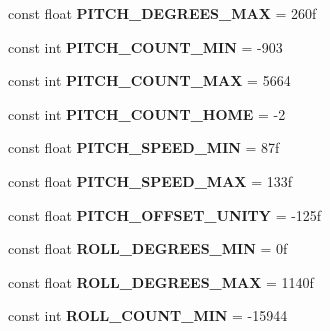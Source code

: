 \begin{DoxyCompactItemize}
const float {\bfseries P\+I\+T\+C\+H\+\_\+\+D\+E\+G\+R\+E\+E\+S\+\_\+\+M\+AX} = 260f
\item 
\mbox{\label{class_scorbot_e_r_v_plus_a415a048b02269851a05f53c812ef5598}} 
const int {\bfseries P\+I\+T\+C\+H\+\_\+\+C\+O\+U\+N\+T\+\_\+\+M\+IN} = -\/903
\item 
\mbox{\label{class_scorbot_e_r_v_plus_a9f7d1ace1dc05a380a038dcac8e66d97}} 
const int {\bfseries P\+I\+T\+C\+H\+\_\+\+C\+O\+U\+N\+T\+\_\+\+M\+AX} = 5664
\item 
\mbox{\label{class_scorbot_e_r_v_plus_ae92515118ebb9a15ed56075a6cf410c4}} 
const int {\bfseries P\+I\+T\+C\+H\+\_\+\+C\+O\+U\+N\+T\+\_\+\+H\+O\+ME} = -\/2
\item 
\mbox{\label{class_scorbot_e_r_v_plus_aa6e58e313ecef3017eff2ed96d113fcf}} 
const float {\bfseries P\+I\+T\+C\+H\+\_\+\+S\+P\+E\+E\+D\+\_\+\+M\+IN} = 87f
\item 
\mbox{\label{class_scorbot_e_r_v_plus_aaf633722272caef41328d57ad9ae7f41}} 
const float {\bfseries P\+I\+T\+C\+H\+\_\+\+S\+P\+E\+E\+D\+\_\+\+M\+AX} = 133f
\item 
\mbox{\label{class_scorbot_e_r_v_plus_ab1d9b24e07da71df013d818cbcfc81ba}} 
const float {\bfseries P\+I\+T\+C\+H\+\_\+\+O\+F\+F\+S\+E\+T\+\_\+\+U\+N\+I\+TY} = -\/125f
\item 
\mbox{\label{class_scorbot_e_r_v_plus_a7f8cb0f5ef4d1b2d898a93de44aead31}} 
const float {\bfseries R\+O\+L\+L\+\_\+\+D\+E\+G\+R\+E\+E\+S\+\_\+\+M\+IN} = 0f
\item 
\mbox{\label{class_scorbot_e_r_v_plus_a98789ef1835295706a3e3f36d02210a0}} 
const float {\bfseries R\+O\+L\+L\+\_\+\+D\+E\+G\+R\+E\+E\+S\+\_\+\+M\+AX} = 1140f
\item 
\mbox{\label{class_scorbot_e_r_v_plus_a727be3e6188a55308291d7f9531cbbd4}} 
const int {\bfseries R\+O\+L\+L\+\_\+\+C\+O\+U\+N\+T\+\_\+\+M\+IN} = -\/15944
\item 

\end{DoxyCompactItemize}
